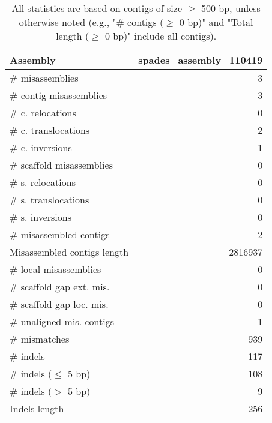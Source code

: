 \documentclass[12pt,a4paper]{article}
\begin{document}
\begin{table}[ht]
\begin{center}
\caption{All statistics are based on contigs of size $\geq$ 500 bp, unless otherwise noted (e.g., "\# contigs ($\geq$ 0 bp)" and "Total length ($\geq$ 0 bp)" include all contigs).}
\begin{tabular}{|l*{1}{|r}|}
\hline
Assembly & spades\_assembly\_110419 \\ \hline
\# misassemblies & 3 \\ \hline
\hspace{2mm}\# contig misassemblies & 3 \\ \hline
\hspace{5mm}\# c. relocations & 0 \\ \hline
\hspace{5mm}\# c. translocations & 2 \\ \hline
\hspace{5mm}\# c. inversions & 1 \\ \hline
\hspace{2mm}\# scaffold misassemblies & 0 \\ \hline
\hspace{5mm}\# s. relocations & 0 \\ \hline
\hspace{5mm}\# s. translocations & 0 \\ \hline
\hspace{5mm}\# s. inversions & 0 \\ \hline
\# misassembled contigs & 2 \\ \hline
Misassembled contigs length & 2816937 \\ \hline
\# local misassemblies & 0 \\ \hline
\# scaffold gap ext. mis. & 0 \\ \hline
\# scaffold gap loc. mis. & 0 \\ \hline
\# unaligned mis. contigs & 1 \\ \hline
\# mismatches & 939 \\ \hline
\# indels & 117 \\ \hline
\hspace{5mm}\# indels ($\leq$ 5 bp) & 108 \\ \hline
\hspace{5mm}\# indels ($>$ 5 bp) & 9 \\ \hline
Indels length & 256 \\ \hline
\end{tabular}
\end{center}
\end{table}
\end{document}
